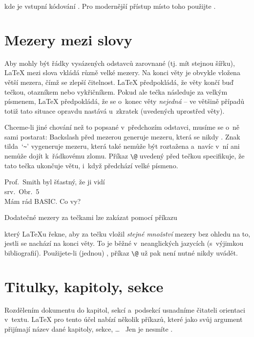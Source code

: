 \noindent kde  je vstupní kódování . Pro modernější přístup
místo toho použijte .

\section{Mezery mezi slovy}

Aby mohly být řádky vysázených odstavců zarovnané (tj. mít stejnou šířku),
\LaTeX{} mezi slova vkládá různě velké mezery. Na konci věty je obvykle
vložena větší mezera, čímž se zlepší čitelnost. \LaTeX{} předpokládá, že
věty končí buď tečkou, otazníkem nebo vykřičníkem. Pokud ale tečka
následuje za velkým písmenem, \LaTeX{} předpokládá, že se o~konec věty
\emph{nejedná} -- ve většině případů totiž tato situace opravdu nastává
u~zkratek (uvedených uprostřed věty).

Chceme-li jiné chování než to popsané v~předchozím odstavci, musíme se
o~ně sami postarat: Backslash před mezerou generuje mezeru, která se
nikdy . Znak tilda~`\verb|~|' vygeneruje mezeru, která
také nemůže být roztažena a~navíc v~ní ani nemůže dojít k~řádkovému
zlomu. Příkaz \verb|\@| uvedený před tečkou specifikuje, že tato tečka
ukončuje větu, i~když předchází velké písmeno.

\begin{example}
Prof.~Smith byl šťastný, že
ji vidí\\
srv.~Obr.~5\\
Mám rád BASIC\@. Co vy?
\end{example}

Dodatečné mezery za tečkami lze zakázat pomocí příkazu
\begin{lscommand}
\end{lscommand}
\noindent který \LaTeX u řekne, aby za tečku vložil \emph{stejné množství}
mezery bez ohledu na to, jestli se nachází na
konci věty. To je běžné v~neanglických jazycích
(s~výjimkou bibliografií). Použijete-li (jednou) , příkaz
\verb|\@| už pak není nutné nikdy uvádět.

\section{Titulky, kapitoly, sekce}

Rozdělením dokumentu do kapitol, sekcí a~podsekcí usnadníme čitateli
orientaci v~textu. \LaTeX{} pro tento účel nabízí několik příkazů,
které jako svůj argument přijímají název dané kapitoly, sekce, \ldots
\ Jen je nesmíte .

